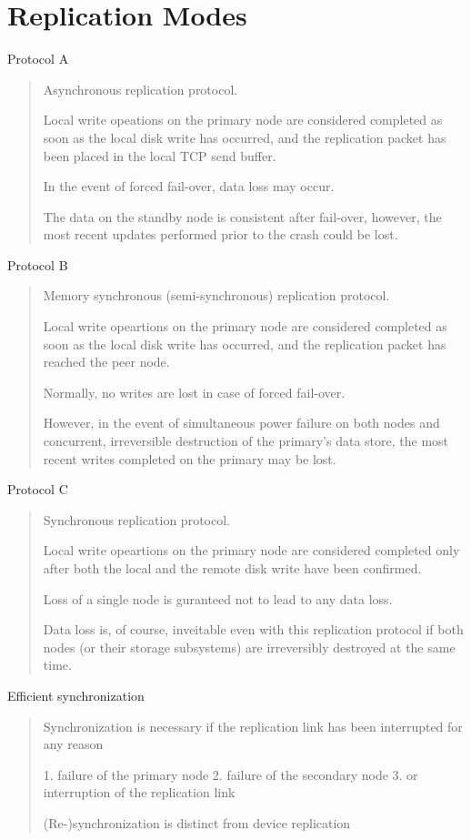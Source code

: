 \section{Replication Modes}

Protocol A
\begin{quote}
Asynchronous replication protocol.

Local write opeations on the primary node are considered completed as
soon as the local disk write has occurred, and the replication packet
has been placed in the local TCP send buffer.

In the event of forced fail-over, data loss may occur.

The data on the standby node is consistent after fail-over, however,
the most recent updates performed prior to the crash could be lost.
\end{quote}

Protocol B
\begin{quote}
Memory synchronous (semi-synchronous) replication protocol.

Local write opeartions on the primary node are considered completed as
soon as the local disk write has occurred, and the replication packet
has reached the peer node.

Normally, no writes are lost in case of forced fail-over.

However, in the event of simultaneous power failure on both nodes and
concurrent, irreversible destruction of the primary's data store, the
most recent writes completed on the primary may be lost.
\end{quote}

Protocol C
\begin{quote}
Synchronous replication protocol.

Local write opeartions on the primary node are considered completed
only after both the local and the remote disk write have been
confirmed.

Loss of a single node is guranteed not to lead to any data loss.

Data loss is, of course, inveitable even with this replication
protocol if both nodes (or their storage subsystems) are irreversibly
destroyed at the same time.
\end{quote}

Efficient synchronization
\begin{quote}
Synchronization is necessary if the replication link has been
interrupted for any reason

1. failure of the primary node
2. failure of the secondary node
3. or interruption of the replication link

(Re-)synchronization is distinct from device replication
\end{quote}

